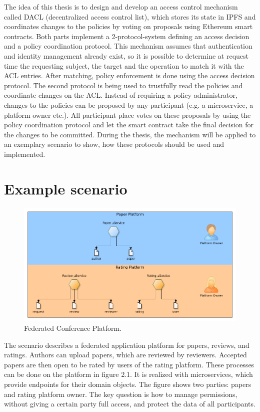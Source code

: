 \documentclass[12pt, conference]{IEEEtran}
\begin{document}
The idea of this thesis is to design and develop an access control mechanism called DACL (decentralized access control list), which stores its state in IPFS and coordinates changes to the policies by voting on proposals using Ethereum smart contracts. Both parts implement a 2-protocol-system defining an access decision and a policy coordination protocol. This mechanism assumes that authentication and identity management already exist, so it is possible to determine at request time the requesting subject, the target and the operation to match it with the ACL entries. After matching, policy enforcement is done using the access decision protocol. The second protocol is being used to trustfully read the policies and coordinate changes on the ACL. Instead of requiring a policy administrator, changes to the policies can be proposed by any participant (e.g. a microservice, a platform owner etc.). All participant place votes on these proposals by using the policy coordination protocol and let the smart contract take the final decision for the changes to be committed. During the thesis, the mechanism will be applied to an exemplary scenario to show, how these protocols should be used and implemented.



\section{Example scenario}

\begin{figure}[!h]
\centering
  \includegraphics[width=\linewidth]{figures/platform.png}
  \caption{Federated Conference Platform.}
  \label{fig:platform}
\end{figure}

The scenario describes a federated application platform for papers, reviews, and ratings. Authors can upload papers, which are reviewed by reviewers. Accepted papers are then open to be rated by users of the rating platform. These processes can be done on the platform in figure 2.1. It is realized with microservices, which provide endpoints for their domain objects. The figure shows two parties: papers and rating platform owner. The key question is how to manage permissions, without giving a certain party full access, and protect the data of all participants.
\end{document}
